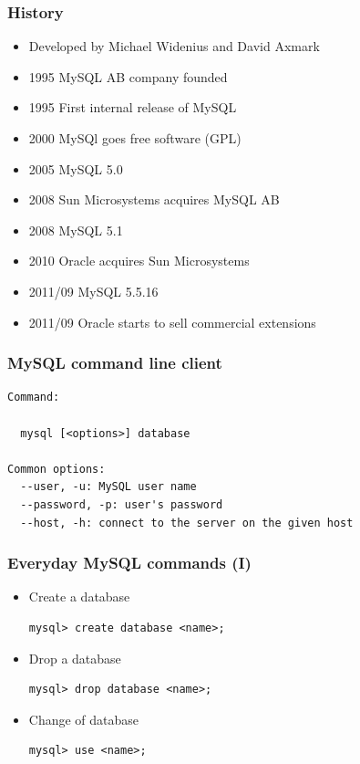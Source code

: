 \documentclass{beamer}
\begin{document}
\begin{frame}
\frametitle{History}

\begin{itemize}
\item Developed by Michael Widenius and David Axmark
\item 1995 MySQL AB company founded
\item 1995 First internal release of MySQL
\item 2000 MySQl goes free software (GPL)
\item 2005 MySQL 5.0
\item 2008 Sun Microsystems acquires MySQL AB
\item 2008 MySQL 5.1
\item 2010 Oracle acquires Sun Microsystems
\item 2011/09 MySQL 5.5.16
\item 2011/09 Oracle starts to sell commercial extensions
\end{itemize}

\end{frame}


\begin{frame}[fragile]
\frametitle{MySQL command line client}

\begin{verbatim}
Command:

  mysql [<options>] database

Common options:
  --user, -u: MySQL user name
  --password, -p: user's password
  --host, -h: connect to the server on the given host
\end{verbatim}

\end{frame}


\begin{frame}[fragile]
\frametitle{Everyday MySQL commands (I)}

\begin{itemize}
\item Create a database
\begin{verbatim}
mysql> create database <name>;

\end{verbatim}

\item Drop a database
\begin{verbatim}
mysql> drop database <name>;

\end{verbatim}

\item Change of database
\begin{verbatim}
mysql> use <name>;

\end{verbatim}
\end{itemize}

\end{frame}
\end{document}
